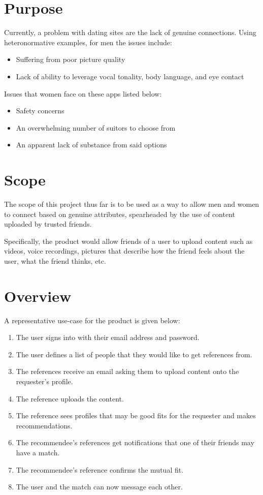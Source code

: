 \section{Purpose}
Currently, a problem with dating sites are the lack of genuine connections. Using heteronormative examples,
for men the issues include:

\begin{itemize}
    \item Suffering from poor picture quality
    \item Lack of ability to leverage vocal tonality, body language, and eye contact
\end{itemize}

Issues that women face on these apps listed below:
\begin{itemize}
    \item Safety concerns
    \item An overwhelming number of suitors to choose from
    \item An apparent lack of substance from said options
\end{itemize}


\section{Scope}
The scope of this project thus far is to be used as a way to allow men and women to connect based on genuine attributes,
spearheaded by the use of content uploaded by trusted friends.

Specifically, the product would allow friends of a user to upload content such as videos, voice recordings, pictures that describe
how the friend feels about the user, what the friend thinks, etc. 


\section{Overview}
A representative use-case for the product is given below:

\begin{enumerate}
    \item The user signs into \serviceName with their email address and password.
    \item The user defines a list of people that they would like to get references from. 
    \item The references receive an email asking them to upload content onto the requester's profile.
    \item The reference uploads the content.
    \item The reference sees profiles that may be good fits for the requester and makes recommendations.
    \item The recommendee's references get notifications that one of their friends may have a match.
    \item The recommendee's reference confirms the mutual fit.
    \item The user and the match can now message each other.
\end{enumerate}


